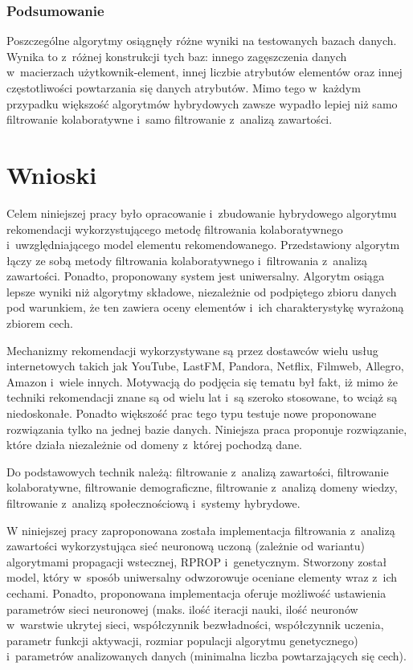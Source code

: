 \documentclass[twoside]{iisthesis}
\begin{document}
		
		\subsection{Podsumowanie}
		
		Poszczególne algorytmy osiągnęły różne wyniki na testowanych bazach danych. Wynika to z~różnej konstrukcji tych baz: innego zagęszczenia danych w~macierzach użytkownik-element, innej liczbie atrybutów elementów oraz innej częstotliwości powtarzania się danych atrybutów. Mimo tego w~każdym przypadku większość algorytmów hybrydowych zawsze wypadło lepiej niż samo filtrowanie kolaboratywne i~samo filtrowanie z~analizą zawartości. 
	

\chapter{Wnioski}

	Celem niniejszej pracy było opracowanie i~zbudowanie hybrydowego algorytmu rekomendacji wykorzystującego metodę filtrowania kolaboratywnego i~uwzględniającego model elementu rekomendowanego. Przedstawiony algorytm łączy ze sobą metody filtrowania kolaboratywnego i~filtrowania z~analizą zawartości. Ponadto, proponowany system jest uniwersalny. Algorytm osiąga lepsze wyniki niż algorytmy składowe, niezależnie od podpiętego zbioru danych pod warunkiem, że ten zawiera oceny elementów i~ich charakterystykę wyrażoną zbiorem cech.

	Mechanizmy rekomendacji wykorzystywane są przez dostawców wielu usług internetowych takich jak YouTube, LastFM, Pandora, Netflix, Filmweb, Allegro, Amazon i~wiele innych. Motywacją do podjęcia się tematu był fakt, iż mimo że techniki rekomendacji znane są od wielu lat i~są szeroko stosowane, to wciąż są niedoskonałe. Ponadto większość prac tego typu testuje nowe proponowane rozwiązania tylko na jednej bazie danych. Niniejsza praca proponuje rozwiązanie, które działa niezależnie od domeny z~której pochodzą dane.
	
	Do podstawowych technik należą: filtrowanie z~analizą zawartości, filtrowanie kolaboratywne, filtrowanie demograficzne, filtrowanie z~analizą domeny wiedzy, filtrowanie z~analizą społecznościową i~systemy hybrydowe. 
	
	W niniejszej pracy zaproponowana została implementacja filtrowania z~analizą zawartości wykorzystująca sieć neuronową uczoną (zależnie od wariantu) algorytmami propagacji wstecznej, RPROP i~genetycznym. Stworzony został model, który w~sposób uniwersalny odwzorowuje oceniane elementy wraz z~ich cechami. Ponadto, proponowana implementacja oferuje możliwość ustawienia parametrów sieci neuronowej (maks. ilość iteracji nauki, ilość neuronów w~warstwie ukrytej sieci, współczynnik bezwładności, współczynnik uczenia, parametr funkcji aktywacji, rozmiar populacji algorytmu genetycznego) i~parametrów analizowanych danych (minimalna liczba powtarzających się cech).
	
\end{document}
